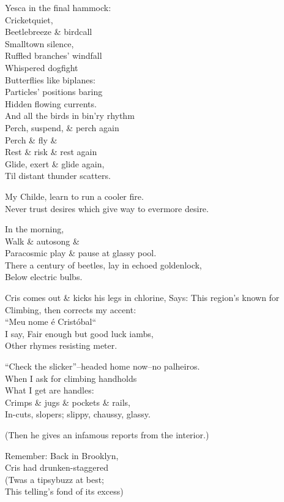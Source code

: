 Yesca in the final hammock: \\
Cricketquiet, \\
Beetlebreeze \& birdcall \\
Smalltown silence, \\
Ruffled branches' windfall \\
Whispered dogfight \\
Butterflies like biplanes: \\
Particles' positions baring \\
Hidden flowing currents. \\

And all the birds in bin'ry rhythm \\
Perch, suspend, \& perch again \\
Perch \& fly \& \\
Rest \& risk \& rest again \\
Glide, exert \& glide again, \\
Til distant thunder scatters.

My Childe, learn to run a cooler fire. \\
Never trust desires which give way to evermore desire.

In the morning,\\
Walk \& autosong \& \\
Paracosmic play \& pause at glassy pool. \\
There a century of beetles, lay in echoed goldenlock, \\
Below electric bulbs. 

Cris comes out \& kicks his legs in chlorine,
Says: This region's known for \\
Climbing, then corrects my accent: \\
``Meu nome é Cristóbal`` \\
I say, Fair enough but good luck iambs, \\
Other rhymes resisting meter.

``Check the slicker''--headed home now--no palheiros. \\
When I ask for climbing handholds \\
What I get are handles: \\
Crimps \& jugs \& pockets \& rails, \\
In-cuts, slopers; slippy, chaussy, glassy. 

(Then he gives an infamous reports from the interior.)

Remember: Back in Brooklyn, \\
Cris had drunken-staggered \\
(Twas a tipsybuzz at best; \\
This telling's fond of its excess) 

